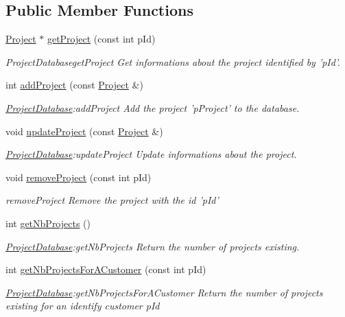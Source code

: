 \subsection*{Public Member Functions}
\begin{DoxyCompactItemize}
\item 
\hyperlink{classProject}{Project} $\ast$ \hyperlink{classProjectDatabase_a895c03003dc4deea0bc429776337795f}{get\-Project} (const int p\-Id)
\begin{DoxyCompactList}\small\item\em Project\-Databaseget\-Project Get informations about the project identified by 'p\-Id'. \end{DoxyCompactList}\item 
int \hyperlink{classProjectDatabase_a3e2c3d198f7f5724ae0388fd49f4e8cb}{add\-Project} (const \hyperlink{classProject}{Project} \&)
\begin{DoxyCompactList}\small\item\em \hyperlink{classProjectDatabase}{Project\-Database}\-:add\-Project Add the project 'p\-Project' to the database. \end{DoxyCompactList}\item 
\hypertarget{classProjectDatabase_a959b2f9617969277a8c92a8239c613f1}{void \hyperlink{classProjectDatabase_a959b2f9617969277a8c92a8239c613f1}{update\-Project} (const \hyperlink{classProject}{Project} \&)}\label{classProjectDatabase_a959b2f9617969277a8c92a8239c613f1}

\begin{DoxyCompactList}\small\item\em \hyperlink{classProjectDatabase}{Project\-Database}\-:update\-Project Update informations about the project. \end{DoxyCompactList}\item 
void \hyperlink{classProjectDatabase_a52f3c3b312c418568531eb4cd2ecf615}{remove\-Project} (const int p\-Id)
\begin{DoxyCompactList}\small\item\em remove\-Project Remove the project with the id 'p\-Id' \end{DoxyCompactList}\item 
int \hyperlink{classProjectDatabase_a48ab28fa18bc3f0371f8c17c5421a46e}{get\-Nb\-Projects} ()
\begin{DoxyCompactList}\small\item\em \hyperlink{classProjectDatabase}{Project\-Database}\-:get\-Nb\-Projects Return the number of projects existing. \end{DoxyCompactList}\item 
int \hyperlink{classProjectDatabase_a3dbf2e270674727fc479d392c6609dec}{get\-Nb\-Projects\-For\-A\-Customer} (const int p\-Id)
\begin{DoxyCompactList}\small\item\em \hyperlink{classProjectDatabase}{Project\-Database}\-:get\-Nb\-Projects\-For\-A\-Customer Return the number of projects existing for an identify customer {\itshape p\-Id} \end{DoxyCompactList}\end{DoxyCompactItemize}
